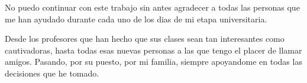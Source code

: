 No puedo continuar con este trabajo sin antes agradecer a todas las personas que me han ayudado durante cada uno de los dias de mi etapa universitaria.


Desde los profesores que han hecho que sus clases sean tan interesantes como cautivadoras, hasta todas esas nuevas personas a las que tengo el placer de llamar amigos. Pasando, por su puesto, por mi familia, siempre apoyandome en todas las decisiones que he tomado.
